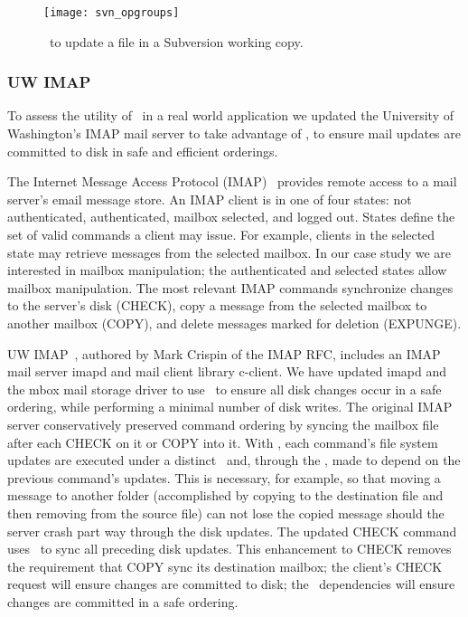 \begin{figure}[htb]
  \centering
  \texttt{[image: svn\_opgroups]}
  \caption{\Opgroups\ to update a file in a Subversion working copy.}
  \label{fig:svn-order}
\end{figure}

\subsubsection{UW IMAP}
\label{sec:opgroup:uwimap}

To assess the utility of \opgroups\ in a real world application we
updated the University of Washington's IMAP mail server to take
advantage of \opgroups, to ensure mail updates are committed to disk
in safe and efficient orderings.

The Internet Message Access Protocol (IMAP)~\cite{rfc3501} provides
remote access to a mail server's email message store. An IMAP client
is in one of four states: not authenticated, authenticated, mailbox
selected, and logged out. States define the set of valid commands a
client may issue. For example, clients in the selected state may
retrieve messages from the selected mailbox. In our case study we are
interested in mailbox manipulation; the authenticated and selected
states allow mailbox manipulation. The most relevant IMAP commands
synchronize changes to the server's disk (CHECK), copy a message from
the selected mailbox to another mailbox (COPY), and delete messages
marked for deletion (EXPUNGE).

UW IMAP~\cite{uwimap}, authored by Mark Crispin of the IMAP RFC,
includes an IMAP mail server imapd and mail client library c-client.
We have updated imapd and the mbox mail storage driver to use
\opgroups\ to ensure all disk changes occur in a safe ordering, while
performing a minimal number of disk writes.
%
The original IMAP server conservatively preserved command ordering by
syncing the mailbox file after each CHECK on it or COPY into it. With
\opgroups, each command's file system updates are executed under a
distinct \opgroup\ and, through the \opgroup, made to depend on the
previous command's updates. This is necessary, for example, so that
moving a message to another folder (accomplished by copying to the
destination file and then removing from the source file) can not lose
the copied message should the server crash part way through the disk
updates.
%
The updated CHECK command uses \pgSync\ to sync all preceding disk
updates. This enhancement to CHECK removes the requirement that COPY
sync its destination mailbox; the client's CHECK request will ensure
changes are committed to disk; the \opgroup\ dependencies will ensure
changes are committed in a safe ordering.

